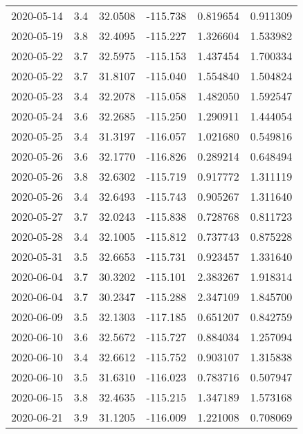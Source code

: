 \begin{tabular}{lrrrrr}
2020-05-14 &       3.4 &  32.0508 &  -115.738 &         0.819654 &         0.911309 \\
2020-05-19 &       3.8 &  32.4095 &  -115.227 &         1.326604 &         1.533982 \\
2020-05-22 &       3.7 &  32.5975 &  -115.153 &         1.437454 &         1.700334 \\
2020-05-22 &       3.7 &  31.8107 &  -115.040 &         1.554840 &         1.504824 \\
2020-05-23 &       3.4 &  32.2078 &  -115.058 &         1.482050 &         1.592547 \\
2020-05-24 &       3.6 &  32.2685 &  -115.250 &         1.290911 &         1.444054 \\
2020-05-25 &       3.4 &  31.3197 &  -116.057 &         1.021680 &         0.549816 \\
2020-05-26 &       3.6 &  32.1770 &  -116.826 &         0.289214 &         0.648494 \\
2020-05-26 &       3.8 &  32.6302 &  -115.719 &         0.917772 &         1.311119 \\
2020-05-26 &       3.4 &  32.6493 &  -115.743 &         0.905267 &         1.311640 \\
2020-05-27 &       3.7 &  32.0243 &  -115.838 &         0.728768 &         0.811723 \\
2020-05-28 &       3.4 &  32.1005 &  -115.812 &         0.737743 &         0.875228 \\
2020-05-31 &       3.5 &  32.6653 &  -115.731 &         0.923457 &         1.331640 \\
2020-06-04 &       3.7 &  30.3202 &  -115.101 &         2.383267 &         1.918314 \\
2020-06-04 &       3.7 &  30.2347 &  -115.288 &         2.347109 &         1.845700 \\
2020-06-09 &       3.5 &  32.1303 &  -117.185 &         0.651207 &         0.842759 \\
2020-06-10 &       3.6 &  32.5672 &  -115.727 &         0.884034 &         1.257094 \\
2020-06-10 &       3.4 &  32.6612 &  -115.752 &         0.903107 &         1.315838 \\
2020-06-10 &       3.5 &  31.6310 &  -116.023 &         0.783716 &         0.507947 \\
2020-06-15 &       3.8 &  32.4635 &  -115.215 &         1.347189 &         1.573168 \\
2020-06-21 &       3.9 &  31.1205 &  -116.009 &         1.221008 &         0.708069 \\

\end{tabular}
